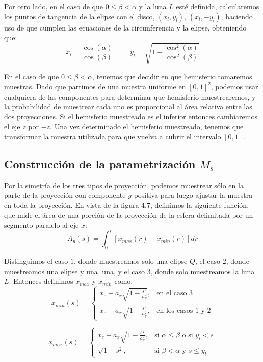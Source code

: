 Por otro lado, en el caso de que $0\leq\beta<\alpha$ y la luna $L$ esté definida, calcularemos los puntos de tangencia de la elipse con el disco, $(x_l,y_l)$, $(x_l,-y_l)$, haciendo uso de que cumplen las ecuaciones de la circunferencia y la elipse, obteniendo que:
$$x_l = \frac{\cos(\alpha)}{\cos(\beta)}\hspace{1cm} y_l=\sqrt{1-\frac{\cos^2(\alpha)}{\cos^2(\beta)}}$$

En el caso de que $0\leq\beta<\alpha$, tenemos que decidir en que hemisferio tomaremos muestras. Dado que partimos de una muestra uniforme en $[0,1]^2$, podemos usar cualquiera de las componentes para determinar que hemisferio muestrearemos, y la probabilidad de muestrear cada uno es proporcional al área relativa entre las dos proyecciones. Si el hemisferio muestreado es el inferior entonces cambiaremos el eje $z$ por $-z$. Una vez determinado el hemisferio muestreado, tenemos que transformar la muestra utilizada para que vuelva a cubrir el intervalo $[0,1]$.

\subsection{Construcción de la parametrización $M_s$}
Por la simetría de los tres tipos de proyección, podemos muestrear sólo en la parte de la proyección con componente $y$ positiva para luego ajustar la muestra en toda la proyección. En vista de la figura 4.7, definimos la siguiente función, que mide el área de una porción de la proyección de la esfera delimitada por un segmento paralelo al eje $x$:
$$A_p(s) = \int_0^s [x_{max}(r)-x_{min}(r)]dr $$

Distinguimos el caso $1$, donde muestreamos solo una elipse $Q$, el caso $2$, donde muestreamos una elipse y una luna, y el caso $3$, donde solo muestreamos la luna $L$. Entonces definimos $x_{max}$ y $x_{min}$ como:
\[ x_{min}(s) = 
   \begin{cases} 
     x_e-a_x\sqrt{1-\frac{s^2}{a_y^2}},  & \text{en el caso $3$}  \\
     x_e+a_x\sqrt{1-\frac{s^2}{a_y^2}},  & \text{en los casos $1$ y $2$}
   \end{cases}
  \]

\[ x_{max}(s) = 
   \begin{cases} 
       x_e+a_x\sqrt{1-\frac{s^2}{a_y^2}},  & \text{si $\alpha\leq\beta$ o si $y_l<s$} \\
       \sqrt{1-s^2}, & \text{si $\beta < \alpha$ y $s\leq y_l$}
   \end{cases}
\]

